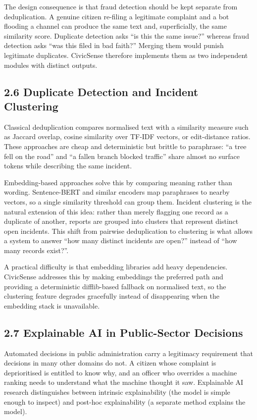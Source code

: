 \documentclass[10pt,letterpaper,oneside]{article}\usepackage{geometry}\geometry{top=1in,bottom=1in,left=1in,right=1in,includeheadfoot}\usepackage{xcolor}\definecolor{color@navy}{HTML}{1F3B63}\definecolor{color@grey}{HTML}{404040}\definecolor{color@hdr}{HTML}{F2F4F7}\usepackage{titlesec}\titleformat{\section}  {\normalfont\huge\bfseries\color@navy}  {}{0pt}{\MakeUppercase}\titleformat{\subsection}  {\normalfont\Large\bfseries\color@navy}  {}{0pt}{}\titleformat{\subsubsection}  {\normalfont\large\bfseries\color@navy}  {}{0pt}{}\titlespacing*{\section}{0pt}{14pt}{6pt}\titlespacing*{\subsection}{0pt}{10pt}{4pt}\titlespacing*{\subsubsection}{0pt}{8pt}{3pt}\setlength{\parindent}{0pt}\setlength{\parskip}{0.6em}\parindent=0pt\usepackage{enumitem}\setlist{nosep,leftmargin=*,itemsep=0pt,topsep=2pt,partopsep=0pt}\usepackage{array}\usepackage{booktabs}\usepackage{caption}\captionsetup{font={small,it},labelfont={bf},labelsep=period,  parskip=2pt,skip=4pt,list=no}\captionsetup[table]{labelfont={bf,small,color@navy},name=Table}\usepackage{graphicx}\usepackage{verbatim}\usepackage{ragged2e}\usepackage{longtable}\usepackage{tabularx}\usepackage{multirow}\usepackage{colortbl}\definecolor{rowshade}{HTML}{F2F4F7}\usepackage{tikz}\usetikzlibrary{positioning,calc}\usepackage[hidelinks]{hyperref}\hypersetup{colorlinks=true,linkcolor=color@navy,urlcolor=color@navy}\pagestyle{fancy}\fancyhf{}\renewcommand{\headrulewidth}{0.4pt}\fancyhead[L]{\small\color@navy CivicSense — Project Report}\fancyhead[R]{\small\color@grey October 11, 2026}\fancyfoot[C]{\small\color@grey An Integrated Intelligent Triage Pipelin}\fancyfoot[R]{\small\color@grey Page \thepage}\usepackage{setspace}\setstretch{1.15}\AtBeginDocument{  \hypersetup{pdftitle={An Integrated Intelligent Triage Pipeline for AI-Enhanced Citizen Complaint Management},    pdfauthor={CivicSense Project Team},    pdfsubject={Project Report},    pdfkeywords={smart cities, NLP, complaint management, e-governance},    pdfcreator={CivicSense Project Team}  }}
\begin{document}
The design consequence is that fraud detection should be kept separate from deduplication. A genuine citizen re-filing a legitimate complaint and a bot flooding a channel can produce the same text and, superficially, the same similarity score. Duplicate detection asks “is this the same issue?” whereas fraud detection asks “was this filed in bad faith?” Merging them would punish legitimate duplicates. CivicSense therefore implements them as two independent modules with distinct outputs.

\subsection*{2.6 Duplicate Detection and Incident Clustering}
Classical deduplication compares normalised text with a similarity measure such as Jaccard overlap, cosine similarity over TF-IDF vectors, or edit-distance ratios. These approaches are cheap and deterministic but brittle to paraphrase: “a tree fell on the road” and “a fallen branch blocked traffic” share almost no surface tokens while describing the same incident.

Embedding-based approaches solve this by comparing meaning rather than wording. Sentence-BERT and similar encoders map paraphrases to nearby vectors, so a single similarity threshold can group them. Incident clustering is the natural extension of this idea: rather than merely flagging one record as a duplicate of another, reports are grouped into clusters that represent distinct open incidents. This shift from pairwise deduplication to clustering is what allows a system to answer “how many distinct incidents are open?” instead of “how many records exist?”.

A practical difficulty is that embedding libraries add heavy dependencies. CivicSense addresses this by making embeddings the preferred path and providing a deterministic difflib-based fallback on normalised text, so the clustering feature degrades gracefully instead of disappearing when the embedding stack is unavailable.

\subsection*{2.7 Explainable AI in Public-Sector Decisions}
Automated decisions in public administration carry a legitimacy requirement that decisions in many other domains do not. A citizen whose complaint is deprioritised is entitled to know why, and an officer who overrides a machine ranking needs to understand what the machine thought it saw. Explainable AI research distinguishes between intrinsic explainability (the model is simple enough to inspect) and post-hoc explainability (a separate method explains the model).
\end{document}

